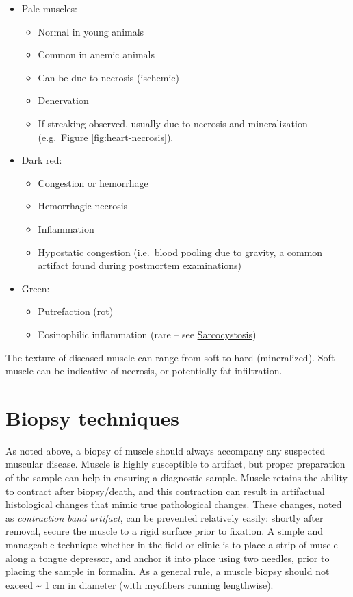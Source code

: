 \documentclass[openany]{book}
\providecommand{\tightlist}{%
  \setlength{\itemsep}{0pt}\setlength{\parskip}{0pt}}
\begin{document}
\begin{itemize}
\tightlist
\item
  Pale muscles:

  \begin{itemize}
  \tightlist
  \item
    Normal in young animals
  \item
    Common in anemic animals
  \item
    Can be due to necrosis (ischemic)
  \item
    Denervation
  \item
    If streaking observed, usually due to necrosis and mineralization
    (e.g.~Figure \ref{fig:heart-necrosis}).
  \end{itemize}
\item
  Dark red:

  \begin{itemize}
  \tightlist
  \item
    Congestion or hemorrhage
  \item
    Hemorrhagic necrosis
  \item
    Inflammation
  \item
    Hypostatic congestion (i.e.~blood pooling due to gravity, a common
    artifact found during postmortem examinations)
  \end{itemize}
\item
  Green:

  \begin{itemize}
  \tightlist
  \item
    Putrefaction (rot)
  \item
    Eosinophilic inflammation (rare -- see
    \protect\hyperlink{sarcocystosis}{Sarcocystosis})
  \end{itemize}
\end{itemize}

The texture of diseased muscle can range from soft to hard
(mineralized). Soft muscle can be indicative of necrosis, or potentially
fat infiltration.

\section{Biopsy techniques}\label{biopsy-techniques}

As noted above, a biopsy of muscle should always accompany any suspected
muscular disease. Muscle is highly susceptible to artifact, but proper
preparation of the sample can help in ensuring a diagnostic sample.
Muscle retains the ability to contract after biopsy/death, and this
contraction can result in artifactual histological changes that mimic
true pathological changes. These changes, noted as \emph{contraction
band artifact}, can be prevented relatively easily: shortly after
removal, secure the muscle to a rigid surface prior to fixation. A
simple and manageable technique whether in the field or clinic is to
place a strip of muscle along a tongue depressor, and anchor it into
place using two needles, prior to placing the sample in formalin. As a
general rule, a muscle biopsy should not exceed \textasciitilde{} 1 cm
in diameter (with myofibers running lengthwise).
\end{document}
